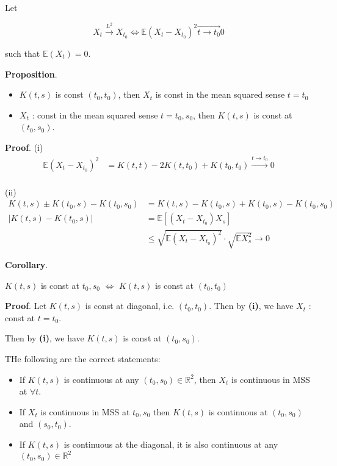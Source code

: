\documentclass[12pt]{article}
\theoremstyle{nonumberbreak}
\begin{document}
Let

$$
X_t \overset{L^2}{\to} X_{t_0} \Leftrightarrow \mathbb{E} (X_t - X_{t_0})^2 \overset{\to}{t\to t_0} 0
$$


such that $\mathbb{E} (X_t) = 0$. 


\begin{theorem}
\textbf{Proposition}.  

\begin{itemize}
	\item $K(t,s)$ is const $(t_0, t_0)$, then $X_t$ is const in the mean squared sense $t=t_0$
	\item $X_t$ : const in the mean squared sense $t=t_0, s_0$, then $K(t,s)$ is const at $(t_0, s_0)$.
\end{itemize}
\end{theorem}


\textbf{Proof}. (i)
$$
\begin{aligned}
\mathbb{E} (X_t - X_{t_0})^2 &= K(t,t) - 2K(t,t_0) + K(t_0, t_0) \overset{t \to t_0}{\to} 0 \\[8pt]
\end{aligned}
$$

(ii)
$$
\begin{aligned}
K(t,s) \pm K(t_0, s) - K(t_0,s_0) &= K(t,s) - K(t_0,s) + K(t_0, s) - K(t_0, s_0) \\[8pt]
|K(t,s) - K(t_0, s)| &= \mathbb{E} \left[ (X_t - X_{t_0}) X_s \right] \\[8pt]
&\le \sqrt{\mathbb{E} (X_t - X_{t_0})^2 } \cdot \sqrt{\mathbb{E} X_s^2 } \to 0
\end{aligned}
$$



\begin{theorem}
\textbf{Corollary}.  

$K(t,s)$ is const at $t_0, s_0$ $\Leftrightarrow$ $K(t,s)$ is const at $(t_0, t_0)$

\end{theorem}

\textbf{Proof}. Let $K(t,s)$ is const at diagonal, i.e. $(t_0, t_0)$. Then by \textbf{(i)}, we have $X_t$ : const at $t=t_0$. 

Then by \textbf{(i)}, we have $K(t,s)$ is const at $(t_0, s_0)$. 


THe following are the correct statements: 

\begin{itemize}
	\item If $K(t,s)$ is continuous at any $(t_0, s_0) \in \mathbb{R}^2$, then $X_t$ is continuous in MSS at $\forall t$. 
	\item If $X_t$ is continuous in MSS at $t_0, s_0$ then $K(t,s)$ is continuous at $(t_0, s_0)$ and $(s_0, t_0)$.
	\item If $K(t,s)$ is continuous at the diagonal, it is also continuous at any $(t_0, s_0) \in \mathbb{R}^2$
\end{itemize}
\end{document}
